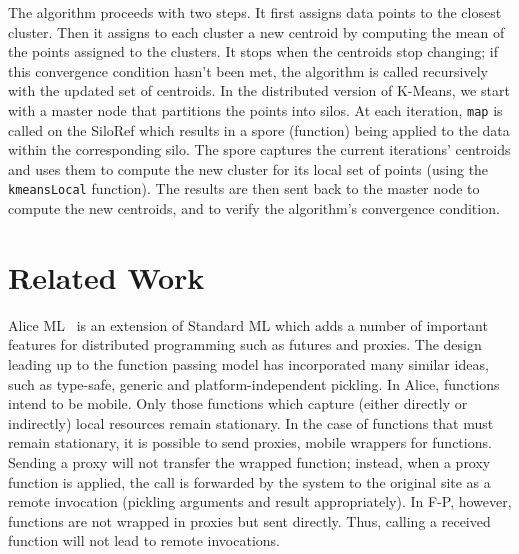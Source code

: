 \documentclass[10pt]{sigplanconf}
\theoremstyle{definition}
\theoremstyle{definition}
\begin{document}
The algorithm proceeds with two steps. It first assigns data points to the
closest cluster. Then it assigns to each cluster a new centroid by computing the
mean of the points assigned to the clusters. It stops when the centroids stop
changing; if this convergence condition hasn't been met, the algorithm is called
recursively with the updated set of centroids. In the distributed version of
K-Means, we start with a master node that partitions the points into silos. At
each iteration, \verb|map| is called on the SiloRef which results in a spore
(function) being applied to the data within the corresponding silo. The spore
captures the current iterations' centroids and uses them to compute the new
cluster for its local set of points (using the \verb|kmeansLocal| function). The
results are then sent back to the master node to compute the new centroids, and
to verify the algorithm's convergence condition.








\section{Related Work}
\label{sec:related-work}

Alice ML~\cite{AliceML} is an extension of Standard ML which adds a number of
important features for distributed programming such as futures and proxies. The
design leading up to the function passing model has incorporated many similar
ideas, such as {type-safe}, generic and platform-independent pickling. In Alice,
functions intend to be mobile. Only those functions which capture (either
directly or indirectly) local resources remain stationary. In the case of
functions that must remain stationary, it is possible to send proxies, mobile
wrappers for functions. Sending a proxy will not transfer the wrapped function;
instead, when a proxy function is applied, the call is forwarded by the system
to the original site as a remote invocation (pickling arguments and result
appropriately). In F-P, however, functions are not wrapped in proxies but sent
directly. Thus, calling a received function will not lead to remote invocations.
\end{document}
